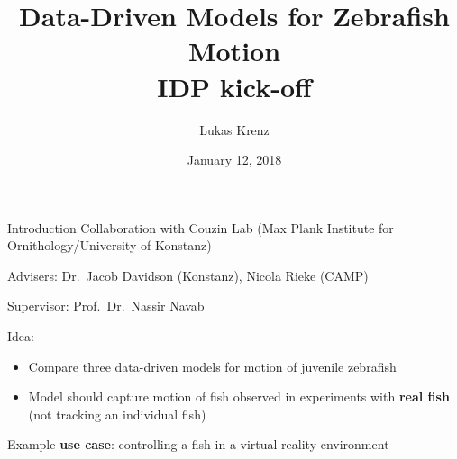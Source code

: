 \documentclass{beamer}
\title{Data-Driven Models for Zebrafish Motion\\IDP kick-off}
\author{Lukas Krenz}
\date{January 12, 2018}
\institute{TUM, Chair for Computer Aided Medical Procedures \textit{\&} Augmented Reality}
\begin{document}
\maketitle
\begin{frame}{Introduction}
Collaboration with Couzin Lab (Max Plank Institute for Ornithology/University of Konstanz)

Advisers: Dr.\ Jacob Davidson (Konstanz), Nicola Rieke (CAMP)

Supervisor: Prof.\ Dr.\ Nassir Navab

Idea:
\begin{itemize}
\item Compare three data-driven models for motion of juvenile zebrafish
\item Model should capture motion of fish observed in experiments with \textbf{real fish} (\alert{not tracking} an individual fish)
\end{itemize}

Example \textbf{use case}: controlling a fish in a virtual reality environment
\end{frame}
\end{document}

